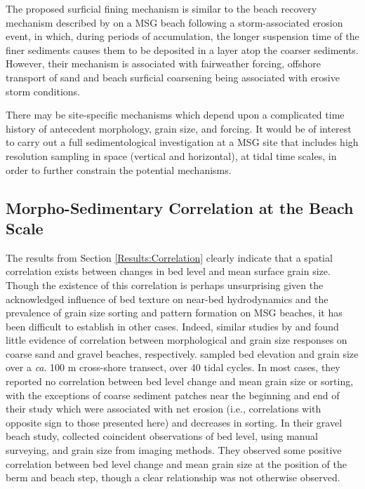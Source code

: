 \documentclass[jmse,article,submit,pdftex,moreauthors]{Definitions/mdpi}
\begin{document}
The proposed surficial fining mechanism is similar to the beach recovery mechanism described by \citet{Bramato_etal2012} on a MSG beach following a storm-associated erosion event, in which, during periods of accumulation, the longer suspension time of the finer sediments causes them to be deposited in a layer atop the coarser sediments. However, their mechanism is associated with fairweather forcing, offshore transport of sand and beach surficial coarsening being associated with erosive storm conditions.

There may be site-specific mechanisms which depend upon a complicated time history of antecedent morphology, grain size, and forcing. It would be of interest to carry out a full sedimentological investigation at a MSG site that includes high resolution sampling in space (vertical and horizontal), at tidal time scales, in order to further constrain the potential mechanisms.


\subsection{Morpho-Sedimentary Correlation at the Beach Scale}\label{Discussion:Correlation}

The results from Section \ref{Results:Correlation} clearly indicate that a spatial correlation exists between changes in bed level and mean surface grain size. Though the existence of this correlation is perhaps unsurprising given the acknowledged influence of bed texture on near-bed hydrodynamics and the prevalence of grain size sorting and pattern formation on MSG beaches, it has been difficult to establish in other cases. Indeed, similar studies by \citet{Masselink_etal2007} and \citet{Austin_Buscombe2008} found little evidence of correlation between morphological and grain size responses on coarse sand and gravel beaches, respectively. \citet{Masselink_etal2007} sampled bed elevation and grain size over a \textit{ca}. 100 m cross-shore transect, over 40 tidal cycles. In most cases, they reported no correlation between bed level change and mean grain size or sorting, with the exceptions of coarse sediment patches near the beginning and end of their study which were associated with net erosion (i.e., correlations with opposite sign to those presented here) and decreases in sorting. In their gravel beach study, \citet{Austin_Buscombe2008} collected coincident observations of bed level, using manual surveying, and grain size from imaging methods. They observed some positive correlation between bed level change and mean grain size at the position of the berm and beach step, though a clear relationship was not otherwise observed. 
\end{document}
